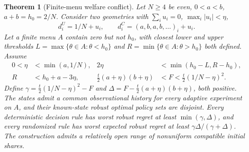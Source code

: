 \documentclass[11pt]{article}
\newtheorem{theorem}{Theorem}
\begin{document}
\begin{theorem}[Finite-menu welfare conflict]\label{thm:welfare}
Let $N\geq4$ be even, $0<a<b$, $a+b=h_0=2/N$. Consider two geometries with $\sum_i u_i=0$, $\max_i|u_i|<\eta$,
\[
d_i^U=1/N+u_i,\qquad d_i^C=(a,b,a,b,\ldots)_i+u_i.
\]
Let a finite menu $A$ contain zero but not $h_0$, with closest lower and upper thresholds $L=\max\{\theta\in A:\theta<h_0\}$ and $R=\min\{\theta\in A:\theta>h_0\}$ both defined. Assume
\begin{align}\label{eq:parameters}
0<\eta&<\min(a,1/N),&2\eta&<\min(h_0-L,R-h_0),\\
R&<h_0+a-3\eta,&\tfrac t2(a+\eta)(b+\eta)&<F<\tfrac t2(1/N-\eta)^2.\nonumber
\end{align}
Define $\gamma=\tfrac t2(1/N-\eta)^2-F$ and $\Delta=F-\tfrac t2(a+\eta)(b+\eta)$, both positive. The states admit a common observational history for every adaptive experiment on $A$, and their known-state robust optimal policy sets are disjoint. Every deterministic decision rule has worst robust regret at least $\min(\gamma,\Delta)$, and every randomized rule has worst expected robust regret at least $\gamma\Delta/(\gamma+\Delta)$. The construction admits a relatively open range of nonuniform compatible initial shares.
\end{theorem}
\end{document}

